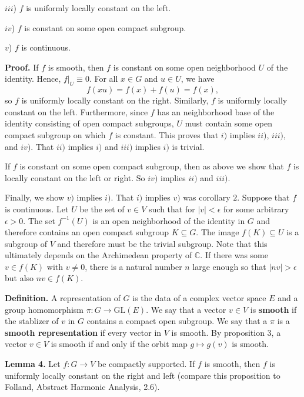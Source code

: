 \documentclass[12pt]{article}
\begin{document}
$iii$) $f$ is uniformly locally constant on the left.

$iv$) $f$ is constant on some open compact subgroup.

$v$) $f$ is continuous.

\textbf{Proof.} If $f$ is smooth, then $f$ is constant on some open neighborhood
$U$ of the identity. Hence, $f|_{U} \equiv 0$. For all $x \in G$ and $u \in U$,
we have
%
\[f\left(xu\right) = f\left(x\right) + f\left(u\right) = f\left(x\right),\]
%
so $f$ is uniformly locally constant on the right. Similarly, $f$ is uniformly
locally constant on the left. Furthermore, since $f$ has an neighborhood base of
the identity consisting of open compact subgroups, $U$ must contain some open
compact subgroup on which $f$ is constant. This proves that $i)$ implies $ii)$,
$iii)$, and $iv)$. That $ii)$ implies $i)$ and $iii)$ implies $i)$ is trivial.

If $f$ is constant on some open compact subgroup, then as above we show that $f$
is locally constant on the left or right. So $iv)$ implies $ii)$ and $iii)$.

Finally, we show $v)$ implies $i)$. That $i)$ implies $v)$ was corollary $2$. Suppose that $f$ is continuous. Let $U$ be the set of $v \in V$ such that for
$\left|v\right| < \epsilon$ for some arbitrary $\epsilon > 0$. The set
$f^{-1}\left(U\right)$ is an open neighborhood of the identity in $G$ and
therefore contains an open compact subgroup $K \subseteq G$. The image
$f\left(K\right) \subseteq U$ is a subgroup of $V$ and therefore must be the
trivial subgroup. Note that this ultimately depends on the Archimedean property
of $\mathbb{C}$. If there was some $v \in f\left(K\right)$ with $v \neq 0$,
there is a natural number $n$ large enough so that $\left|nv\right| > \epsilon$
but also $nv \in f\left(K\right)$.

\textbf{Definition.} A representation of $G$ is the data of a complex vector
space $E$ and a group homomorphism $\pi : G \rightarrow
\text{GL}\left(E\right)$. We say that a vector $v \in V$ is \textbf{smooth} if
the stablizer of $v$ in $G$ contains a compact open subgroup. We say that a
$\pi$ is a \textbf{smooth representation} if every vector in $V$ is smooth. By
proposition 3, a vector $v \in V$ is smooth if and only if the orbit map $g
\mapsto g\left(v\right)$ is smooth.

\textbf{Lemma 4.} Let $f : G \rightarrow V$ be compactly supported. If $f$ is
smooth, then $f$ is uniformly locally constant on the right and left (compare
this proposition to Folland, Abstract Harmonic Analysis, 2.6).
\end{document}
